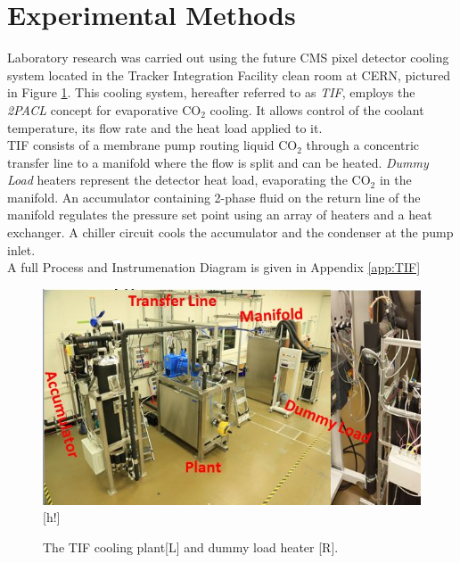 \documentclass{report}
\begin{document}
\section{Experimental Methods}
\FloatBarrier
Laboratory research was carried out using the future CMS pixel detector cooling system located in the Tracker Integration Facility clean room at CERN, pictured in Figure \ref{fig:TIF}. This cooling system, hereafter referred to as \textit{TIF}, employs the \textit{2PACL} concept for evaporative CO$_2$ cooling. It allows control of the coolant temperature, its flow rate and the heat load applied to  it. \\
TIF consists of a membrane pump routing liquid CO$_2$ through a concentric transfer line to a manifold where the flow is split and can be heated. \textit{Dummy Load} heaters represent the detector heat load, evaporating the CO$_2$ in the manifold. An accumulator containing 2-phase fluid on the return line of the manifold regulates the pressure set point using an array of heaters and a heat exchanger. A chiller circuit cools the accumulator and the condenser at the pump inlet.\\
A full Process and Instrumenation Diagram is given in Appendix \ref{app:TIF}
\begin{figure}
\includegraphics[width=\textwidth]{TIFandHeater.jpg}[h!]
\caption{The TIF cooling plant[L] and dummy load heater [R]. \cite{tif web}}
\label{fig:TIF}
\end{figure}
\FloatBarrier
\end{document}
